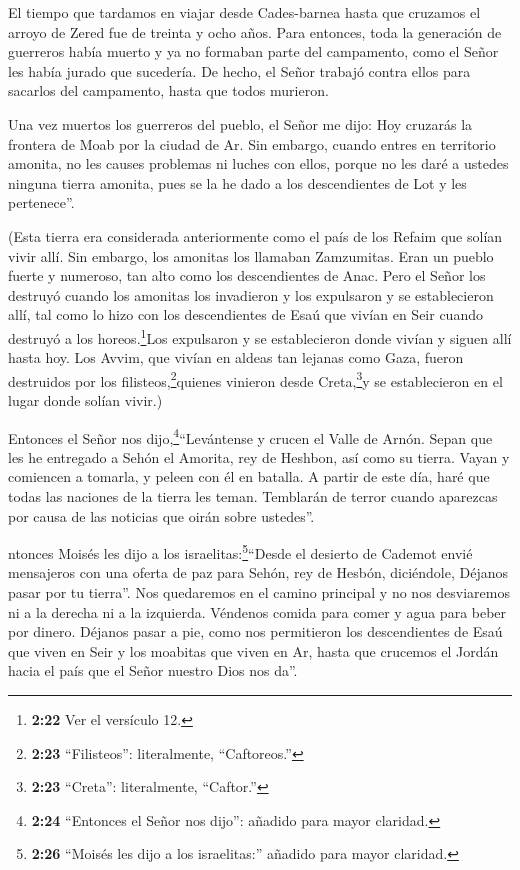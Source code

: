  El tiempo que tardamos en viajar desde Cades-barnea hasta
que cruzamos el arroyo de Zered fue de treinta y ocho años. Para
entonces, toda la generación de guerreros había muerto y ya no formaban
parte del campamento, como el Señor les había jurado que sucedería.
 De hecho, el Señor trabajó contra ellos para sacarlos del
campamento, hasta que todos murieron.

 Una vez muertos los guerreros del pueblo,  el
Señor me dijo:  Hoy cruzarás la frontera de Moab por la
ciudad de Ar.  Sin embargo, cuando entres en territorio
amonita, no les causes problemas ni luches con ellos, porque no les daré
a ustedes ninguna tierra amonita, pues se la he dado a los descendientes
de Lot y les pertenece''.

 (Esta tierra era considerada anteriormente como el país de
los Refaim que solían vivir allí. Sin embargo, los amonitas los llamaban
Zamzumitas.  Eran un pueblo fuerte y numeroso, tan alto
como los descendientes de Anac. Pero el Señor los destruyó cuando los
amonitas los invadieron y los expulsaron y se establecieron allí,
 tal como lo hizo con los descendientes de Esaú que vivían
en Seir cuando destruyó a los horeos.\footnote{\textbf{2:22} Ver el
  versículo 12.}Los expulsaron y se establecieron donde vivían y siguen
allí hasta hoy.  Los Avvim, que vivían en aldeas tan
lejanas como Gaza, fueron destruidos por los
filisteos,\footnote{\textbf{2:23} ``Filisteos'': literalmente,
  ``Caftoreos.''}quienes vinieron desde Creta,\footnote{\textbf{2:23}
  ``Creta'': literalmente, ``Caftor.''}y se establecieron en el lugar
donde solían vivir.)

 Entonces el Señor nos dijo,\footnote{\textbf{2:24}
  ``Entonces el Señor nos dijo'': añadido para mayor claridad.}``Levántense
y crucen el Valle de Arnón. Sepan que les he entregado a Sehón el
Amorita, rey de Heshbon, así como su tierra. Vayan y comiencen a
tomarla, y peleen con él en batalla.  A partir de este día,
haré que todas las naciones de la tierra les teman. Temblarán de terror
cuando aparezcas por causa de las noticias que oirán sobre ustedes''.

 ntonces Moisés les dijo a los
israelitas:\footnote{\textbf{2:26} ``Moisés les dijo a los israelitas:''
  añadido para mayor claridad.}``Desde el desierto de Cademot envié
mensajeros con una oferta de paz para Sehón, rey de Hesbón, diciéndole,
 Déjanos pasar por tu tierra''. Nos quedaremos en el camino
principal y no nos desviaremos ni a la derecha ni a la izquierda.
 Véndenos comida para comer y agua para beber por dinero.
Déjanos pasar a pie,  como nos permitieron los
descendientes de Esaú que viven en Seir y los moabitas que viven en Ar,
hasta que crucemos el Jordán hacia el país que el Señor nuestro Dios nos
da''.

